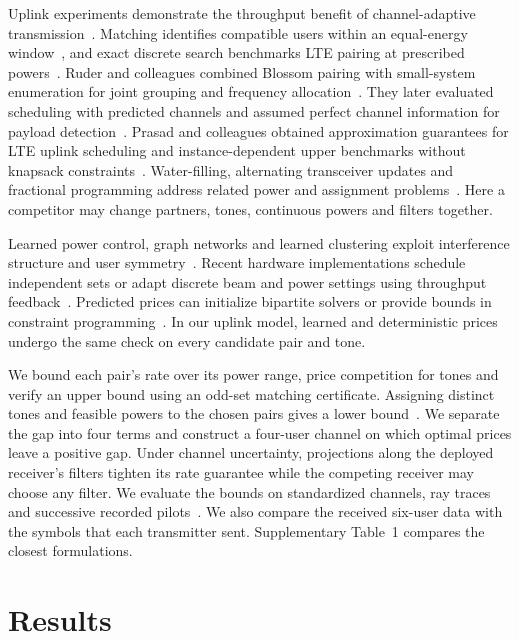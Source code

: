 \documentclass[11pt,letterpaper]{article}
\begin{document}
Uplink experiments demonstrate the throughput benefit of channel-adaptive transmission~\cite{haustein}. Matching identifies compatible users within an equal-energy window~\cite{viterbo}, and exact discrete search benchmarks LTE pairing at prescribed powers~\cite{fan}. Ruder and colleagues combined Blossom pairing with small-system enumeration for joint grouping and frequency allocation~\cite{ruder2013}. They later evaluated scheduling with predicted channels and assumed perfect channel information for payload detection~\cite{ruder2014}. Prasad and colleagues obtained approximation guarantees for LTE uplink scheduling and instance-dependent upper benchmarks without knapsack constraints~\cite{prasad}. Water-filling, alternating transceiver updates and fractional programming address related power and assignment problems~\cite{viswanath,shi,shenfpone,shenfptwo}. Here a competitor may change partners, tones, continuous powers and filters together.

Learned power control, graph networks and learned clustering exploit interference structure and user symmetry~\cite{sun,shen,hejazicluster,ahmadi2026}. Recent hardware implementations schedule independent sets or adapt discrete beam and power settings using throughput feedback~\cite{hamakawa2026,kashimata2026}. Predicted prices can initialize bipartite solvers or provide bounds in constraint programming~\cite{dinitz,bessa}. In our uplink model, learned and deterministic prices undergo the same check on every candidate pair and tone.

We bound each pair's rate over its power range, price competition for tones and verify an upper bound using an odd-set matching certificate. Assigning distinct tones and feasible powers to the chosen pairs gives a lower bound~\cite{edmonds,kuhn}. We separate the gap into four terms and construct a four-user channel on which optimal prices leave a positive gap. Under channel uncertainty, projections along the deployed receiver's filters tighten its rate guarantee while the competing receiver may choose any filter. We evaluate the bounds on standardized channels, ray traces and successive recorded pilots~\cite{tr,sionna,deepmimo,zafari,renew}. We also compare the received six-user data with the symbols that each transmitter sent. Supplementary Table~1 compares the closest formulations.

\section*{Results}
\end{document}
